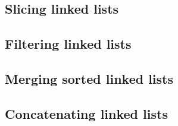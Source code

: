 
\subsection{Slicing linked lists}

\subsection{Filtering linked lists}

\subsection{Merging sorted linked lists}

\subsection{Concatenating linked lists}
